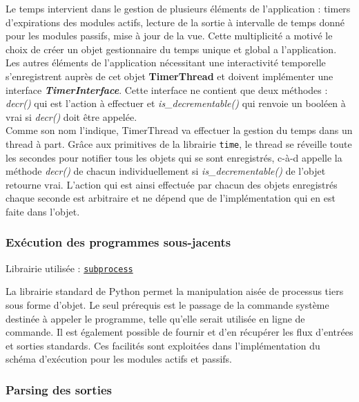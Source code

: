\documentclass[]{article}
\begin{document}
\par Le temps intervient dans le gestion de plusieurs éléments de l'application : timers d'expirations des modules actifs, lecture de la sortie à intervalle de temps donné pour les modules passifs, mise à jour de la vue. Cette multiplicité a motivé le choix de créer un objet gestionnaire du temps unique et global a l'application. Les autres éléments de l'application nécessitant une interactivité temporelle s'enregistrent auprès de cet objet \textbf{TimerThread} et doivent implémenter une interface \textbf{\textit{TimerInterface}}. Cette interface ne contient que deux méthodes : \textit{decr()} qui est l'action à effectuer et \textit{is\_decrementable()} qui renvoie un booléen à vrai si \textit{decr()} doit être appelée.\\

Comme son nom l'indique, TimerThread va effectuer la gestion du temps dans un thread à part. Grâce aux primitives de la librairie \texttt{time}, le thread se réveille toute les secondes pour notifier tous les objets qui se sont enregistrés, c-à-d appelle la méthode \textit{decr()} de chacun individuellement si \textit{is\_decrementable()} de l'objet retourne vrai. L'action qui est ainsi effectuée par chacun des objets enregistrés chaque seconde est arbitraire et ne dépend que de l'implémentation qui en est faite dans l'objet.

\subsubsection{Exécution des programmes sous-jacents}

\noindent Librairie utilisée : \href{https://docs.python.org/fr/3/library/subprocess.html}{\texttt{subprocess}}\\

\par La librairie standard de Python permet la manipulation aisée de processus tiers sous forme d'objet. Le seul prérequis est le passage de la commande système destinée à appeler le programme, telle qu'elle serait utilisée en ligne de commande. Il est également possible de fournir et d'en récupérer les flux d'entrées et sorties standards. Ces facilités sont exploitées dans l'implémentation du schéma d'exécution pour les modules actifs et passifs. 

\subsubsection{Parsing des sorties}
\end{document}
